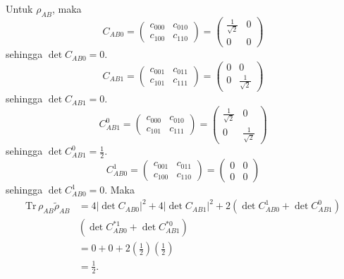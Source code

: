 Untuk $\rho_{AB}$, maka
\begin{equation}
	C_{AB0}=
	\begin{pmatrix}
		c_{000} & c_{010} \\
		c_{100} & c_{110}
	\end{pmatrix}=
	\begin{pmatrix}
		\frac{1}{\sqrt{2}} & 0 \\
		0 & 0
	\end{pmatrix}
\end{equation}
sehingga $\det C_{AB0} = 0$.
\begin{equation}
	C_{AB1}=
	\begin{pmatrix}
		c_{001} & c_{011} \\
		c_{101} & c_{111}
	\end{pmatrix}=
	\begin{pmatrix}
		0 & 0 \\
		0 & \frac{1}{\sqrt{2}}
	\end{pmatrix}
\end{equation}
sehingga $\det C_{AB1} = 0$.
\begin{equation}
	C_{AB1}^0=
	\begin{pmatrix}
		c_{000} & c_{010} \\
		c_{101} & c_{111}
	\end{pmatrix}=
	\begin{pmatrix}
		\frac{1}{\sqrt{2}} & 0 \\
		0 & \frac{1}{\sqrt{2}}
	\end{pmatrix}
\end{equation}
sehingga $\det C_{AB1}^0 = \frac{1}{2}$.
\begin{equation}
	C_{AB0}^1=
	\begin{pmatrix}
		c_{001} & c_{011} \\
		c_{100} & c_{110}
	\end{pmatrix}=
	\begin{pmatrix}
		0 & 0 \\
		0 & 0
	\end{pmatrix}
\end{equation}
sehingga $\det C_{AB0}^1 = 0$. Maka
\begin{equation}
	\begin{aligned}
		\mathrm{Tr}\,\rho_{AB}\tilde{\rho}_{AB}
		&=4 |\det C_{AB0}|^2+ 4 |\det C_{AB1}|^2+ 2 (\det C_{AB0}^1 + \det C_{AB1}^0)\\
		&(\det C^{*1}_{AB0} + \det C^{*0}_{AB1})\\
		&=0+0+2(\frac{1}{2})(\frac{1}{2})\\
		&=\frac{1}{2}.
	\end{aligned}
\end{equation}
